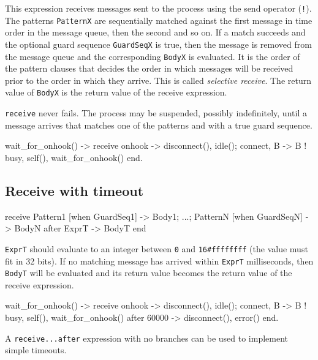 This expression receives messages sent to the process using the send
operator (\texttt{!}). The patterns \texttt{PatternX} are sequentially
matched against the first message in time order in the message queue,
then the second and so on.  If a match succeeds and the optional guard
sequence \texttt{GuardSeqX} is true, then the message is removed from
the message queue and the corresponding \texttt{BodyX} is
evaluated.  It is the order of the pattern clauses that decides the
order in which messages will be received prior to the order in which
they arrive.  This is called \textit{selective receive}. The
return value of \texttt{BodyX} is the return value of the receive
expression.

\texttt{receive} never fails. The process may be suspended, possibly
indefinitely, until a message arrives that matches one of the patterns
and with a true guard sequence.

\newpage
\begin{erlang}
wait_for_onhook() ->
    receive
        onhook ->
            disconnect(),
            idle();
        {connect, B} ->
            B ! {busy, self()},
            wait_for_onhook()
    end.
\end{erlang}


\subsection{Receive with timeout}

\begin{erlang}
receive
    Pattern1 [when GuardSeq1] ->
        Body1;
        ...;
    PatternN [when GuardSeqN] ->
        BodyN
after
    ExprT ->
        BodyT
end
\end{erlang}

\texttt{ExprT} should evaluate to an integer between \texttt{0} and
\texttt{16\#ffffffff} (the value must fit in 32 bits). If no matching
message has arrived within \texttt{ExprT} milliseconds, then
\texttt{BodyT} will be evaluated and its return value becomes the
return value of the receive expression.

\begin{erlang}
wait_for_onhook() ->
    receive
        onhook ->
            disconnect(),
            idle();
        {connect, B} ->
            B ! {busy, self()},
            wait_for_onhook()
    after
        60000 ->
            disconnect(),
            error()
    end.
\end{erlang}

A \texttt{receive...after} expression with no branches can be used to
implement simple timeouts.

